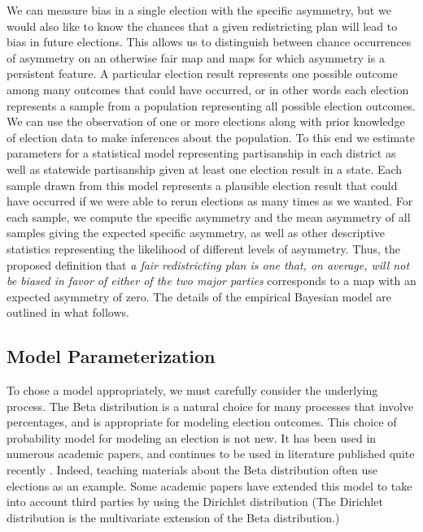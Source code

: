 \documentclass[preprint,12pt]{article}
\begin{document}
We can measure bias in a single election with the specific asymmetry, but we would also like to know the chances that a given redistricting plan will lead to bias in future elections.
This allows us to distinguish between chance occurrences of asymmetry on an otherwise fair map and maps for which asymmetry is a persistent feature.
A particular election result represents one possible outcome among many outcomes that could have occurred, or in other words each election represents a sample from a population representing all possible election outcomes.
We can use the observation of one or more elections along with prior knowledge of election data to make inferences about the population.
To this end we estimate parameters for a statistical model representing partisanship in each district as well as statewide partisanship given at least one election result in a state.
Each sample drawn from this model represents a plausible election result that could have occurred if we were able to rerun elections as many times as we wanted.
For each sample, we compute the specific asymmetry and the mean asymmetry of all samples giving the expected specific asymmetry, as well as other descriptive statistics representing the likelihood of different levels of asymmetry.
Thus, the proposed definition that \emph{a fair redistricting plan is one that, on average, will not be biased in favor of either of the two major parties} corresponds to a map with an expected asymmetry of zero.
The details of the empirical Bayesian model are outlined in what follows.

\subsection{Model Parameterization}
To chose a model appropriately, we must carefully consider the underlying process. 
The Beta distribution is a natural choice for many processes that involve percentages, and is appropriate for modeling election outcomes. 
This choice of probability model for modeling an election is not new. 
It has been used in numerous academic papers, and continues to be used in literature published quite recently \cite{Paolino_2001_,Kaplan_2003_10.1287/opre.51.1.32.12794,Murr_2015_10.1177/2053168015583346}.
Indeed, teaching materials about the Beta distribution often use elections as an example.  
Some academic papers have extended this model to take into account third parties by using the Dirichlet distribution \cite{Rigdon_2009_10.1177/1532673X08330670} (The Dirichlet distribution is the multivariate extension of the Beta distribution.) 
\end{document}
